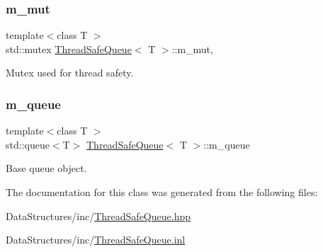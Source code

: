 \subsubsection{\texorpdfstring{m\+\_\+mut}{m\_mut}}
{\footnotesize\ttfamily template$<$class T $>$ \\
std\+::mutex \hyperlink{class_thread_safe_queue}{Thread\+Safe\+Queue}$<$ T $>$\+::m\+\_\+mut\hspace{0.3cm}{\ttfamily [mutable]}, {\ttfamily [private]}}



Mutex used for thread safety. 

\mbox{\label{class_thread_safe_queue_a3b84a16818557f4aee11c1b810e3f953}} 
\subsubsection{\texorpdfstring{m\+\_\+queue}{m\_queue}}
{\footnotesize\ttfamily template$<$class T $>$ \\
std\+::queue$<$T$>$ \hyperlink{class_thread_safe_queue}{Thread\+Safe\+Queue}$<$ T $>$\+::m\+\_\+queue\hspace{0.3cm}{\ttfamily [private]}}



Base queue object. 



The documentation for this class was generated from the following files\+:\begin{DoxyCompactItemize}
\item 
Data\+Structures/inc/\hyperlink{_thread_safe_queue_8hpp}{Thread\+Safe\+Queue.\+hpp}\item 
Data\+Structures/inc/\hyperlink{_thread_safe_queue_8inl}{Thread\+Safe\+Queue.\+inl}\end{DoxyCompactItemize}
